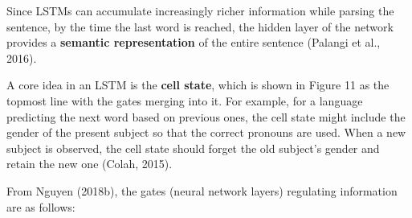 Since LSTMs can accumulate increasingly richer information while parsing the sentence, by the time the last word is reached, the hidden layer of the network provides a \textbf{semantic representation} of the entire sentence (Palangi et al., 2016). 

A core idea in an LSTM is the \textbf{cell state}, which is shown in Figure 11 as the topmost line with the gates merging into it. For example, for a language predicting the next word based on previous ones, the cell state might include the gender of the present subject so that the correct pronouns are used. When a new subject is observed, the cell state should forget the old subject's gender and retain the new one (Colah, 2015). 

From Nguyen (2018b), the gates (neural network layers) regulating information are as follows: 

